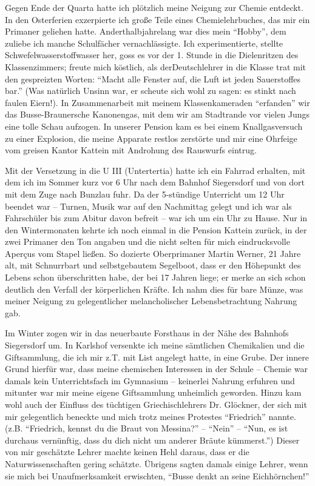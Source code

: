 \documentclass[a5paper,pagesize,10pt,twoside=true]{scrbook}
\begin{document}
Gegen Ende der Quarta hatte ich plötzlich meine Neigung zur Chemie entdeckt. In den Osterferien exzerpierte ich große Teile eines Chemielehrbuches, das mir ein Primaner geliehen hatte. Anderthalbjahrelang war dies mein \enquote{Hobby}, dem zuliebe ich manche Schulfächer vernachlässigte. Ich experimentierte, stellte Schwefelwasserstoffwasser her, goss es vor der 1. Stunde in die Dielenritzen des Klassenzimmers; freute mich köstlich, als der\linebreak Deutschlehrer in die Klasse trat mit den gespreizten Worten: \enquote{Macht alle Fenster auf, die Luft ist jeden Sauerstoffes bar.} (Was natürlich Unsinn war, er scheute sich wohl zu sagen: es stinkt nach faulen Eiern!). In Zusammenarbeit mit meinem Klassenkameraden \enquote{erfanden} wir das Busse-Braunersche Kanonengas, mit dem wir am Stadtrande vor vielen Jungs eine tolle Schau aufzogen. In unserer Pension kam es bei einem Knallgasversuch zu einer Explosion, die meine Apparate restlos zerstörte und mir eine Ohrfeige vom greisen Kantor Kattein mit Androhung des Rauswurfs eintrug.

Mit der Versetzung in die U III (Untertertia) hatte ich ein Fahrrad erhalten, mit dem ich im Sommer kurz vor 6 Uhr nach dem Bahnhof Siegersdorf und von dort mit dem Zuge nach Bunzlau fuhr. Da der 5-stündige Unterricht um 12 Uhr beendet war -- Turnen, Musik war auf den Nachmittag gelegt und ich war als Fahrschüler bis zum Abitur davon befreit -- war ich um ein Uhr zu Hause. Nur in den Wintermonaten kehrte ich noch einmal in die Pension Kattein zurück, in der zwei Primaner den Ton angaben und die nicht selten für mich eindrucksvolle Aperçus vom Stapel ließen. So dozierte Oberprimaner Martin Werner, 21 Jahre alt, mit Schnurrbart und selbstgebautem Segelboot, dass er den Höhepunkt des Lebens schon überschritten habe, der bei 17 Jahren liege; er merke an sich schon deutlich den Verfall der körperlichen Kräfte. Ich nahm dies für bare Münze, was meiner Neigung zu gelegentlicher melancholischer Lebensbetrachtung Nahrung gab.

Im Winter zogen wir in das neuerbaute Forsthaus in der Nähe des Bahnhofs Siegersdorf um. In Karlshof versenkte ich meine sämtlichen Chemikalien und die Giftsammlung, die ich mir z.T. mit List angelegt hatte, in eine Grube. Der innere Grund hierfür war, dass meine chemischen Interessen in der Schule -- Chemie war damals kein Unterrichtsfach im Gymnasium -- keinerlei Nahrung erfuhren und mitunter war mir meine eigene Giftsammlung unheimlich geworden. Hinzu kam wohl auch der Einfluss des tüchtigen Griechischlehrers Dr. Glöckner, der sich mit mir gelegentlich beneckte und mich trotz meines Protestes \enquote{Friedrich} nannte. (z.B. \enquote{Friedrich, kennst du die Braut von Messina?} -- \enquote{Nein} -- \enquote{Nun, es ist durchaus vernünftig, dass du dich nicht um anderer Bräute kümmerst.}) Dieser von mir geschätzte Lehrer machte keinen Hehl daraus, dass er die Naturwissenschaften gering schätzte. Übrigens sagten damals einige Lehrer, wenn sie mich bei Unaufmerksamkeit erwischten, \enquote{Busse denkt an seine Eichhörnchen!}
\end{document}
